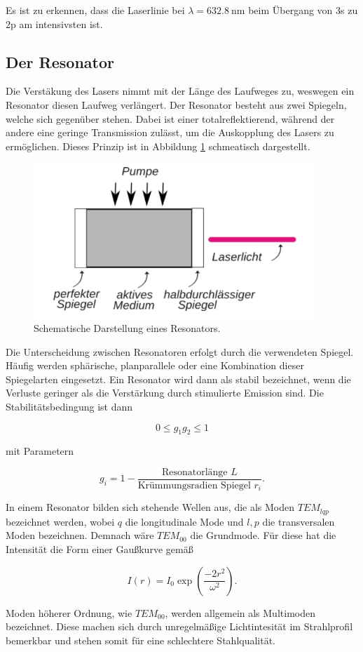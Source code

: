 Es ist zu erkennen, dass die Laserlinie bei $\lambda = \SI{632.8}{\nano\metre}$ beim Übergang von 3s zu 2p am intensivsten ist. 

\subsection{Der Resonator}

Die Verstäkung des Lasers nimmt mit der Länge des Laufweges zu, weswegen ein Resonator diesen Laufweg verlängert. Der Resonator
besteht aus zwei Spiegeln, welche sich gegenüber stehen. Dabei ist einer totalreflektierend, während der andere eine geringe
Transmission zulässt, um die Auskopplung des Lasers zu ermöglichen. Dieses Prinzip ist in Abbildung \ref{fig:resonator} schmeatisch dargestellt.

\begin{figure}[H]
    \centering
    \includegraphics[scale=0.5]{content/Resonator.png}
    \caption{Schematische Darstellung eines Resonators. \cite{Zeugs}}
    \label{fig:resonator}
  \end{figure}

Die Unterscheidung zwischen Resonatoren erfolgt durch die verwendeten Spiegel. Häufig werden sphärische, planparallele oder eine 
Kombination dieser Spiegelarten eingesetzt. Ein Resonator wird dann als stabil bezeichnet, wenn die Verluste geringer als die 
Verstärkung durch stimulierte Emission sind. Die Stabilitätsbedingung ist dann 

\begin{equation}
    0 \leq g_1 g_2 \leq 1
    \label{eqn:Stabi}
\end{equation}

mit Parametern

\begin{equation*}
    g_i = 1 - \frac{\text{Resonatorlänge } L}{\text{Krümmungsradien Spiegel } r_i}.
\end{equation*}

In einem Resonator bilden sich stehende Wellen aus, die als Moden $TEM_{lqp}$ bezeichnet werden, wobei $q$ die longitudinale Mode 
und $l, p$ die transversalen Moden bezeichnen. Demnach wäre $TEM_{00}$ die Grundmode. Für diese hat die Intensität die Form 
einer Gaußkurve gemäß

\begin{equation*}
    I(r) = I_0 \exp{\left(\frac{-2r^2}{\omega ^2}\right)}.
\end{equation*}

Moden höherer Ordnung, wie $TEM_{00}$, werden allgemein als Multimoden bezeichnet. Diese machen sich durch unregelmäßige
Lichtintesität im Strahlprofil bemerkbar und stehen somit für eine schlechtere Stahlqualität. 

